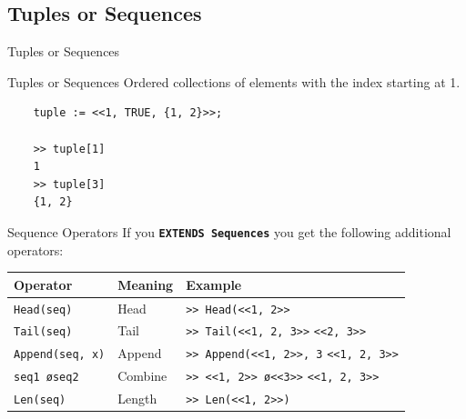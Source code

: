 \documentclass[10pt]{beamer}
\begin{document}
\subsection{Tuples or Sequences}

\begin{frame}[fragile]{Tuples or Sequences}

  \begin{exampleblock}{Tuples or Sequences}
    \alert{Ordered} collections of elements with the \alert{index starting at 1}.
  \end{exampleblock}

  \begin{verbatim}
    tuple := <<1, TRUE, {1, 2}>>;
    
    >> tuple[1]
    1
    >> tuple[3]
    {1, 2}
  \end{verbatim}
\end{frame}

\begin{frame}{Sequence Operators}
  If you \textbf{\texttt{EXTENDS Sequences}} you get the following additional operators:
  \begin{table}
    \begin{tabular}{@{} p{2.5cm}p{2cm}p{3.5cm} @{}}
      \toprule
      Operator & Meaning & Example\\
      \midrule
      \texttt{Head(seq)} & Head & \texttt{>> Head(<<1, 2>>} \newline 1 \\
      \texttt{Tail(seq)} & Tail & \texttt{>> Tail(<<1, 2, 3>>} \newline \texttt{<<2, 3>>} \\
      \texttt{Append(seq, x)} & Append & \texttt{>> Append(<<1, 2>>, 3} \newline \texttt{<<1, 2, 3>>} \\
      \texttt{seq1 \o seq2} & Combine & \texttt{>> <<1, 2>> \o <<3>>} \newline \texttt{<<1, 2, 3>>} \\              \texttt{Len(seq)} & Length & \texttt{>> Len(<<1, 2>>)} \newline 2 \\                
      \bottomrule
    \end{tabular}
  \end{table}
\end{frame}
\end{document}

